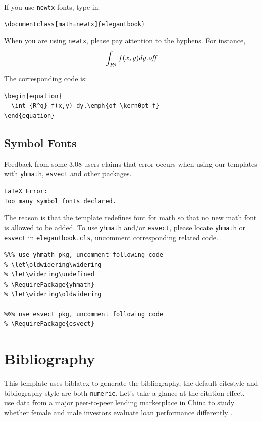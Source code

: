 \documentclass[11pt]{elegantbook}
\begin{document}
If you use \lstinline{newtx} fonts, type in:
\begin{lstlisting}
\documentclass[math=newtx]{elegantbook}
\end{lstlisting}

When you are using \lstinline{newtx}, please pay attention to the hyphens. For instance,
\begin{equation}
\int_{R^q} f(x,y) dy.\emph{of\kern0pt f}
\end{equation}

The corresponding code is: 
\begin{lstlisting}
\begin{equation}
  \int_{R^q} f(x,y) dy.\emph{of \kern0pt f}
\end{equation}
\end{lstlisting}

\subsection{Symbol Fonts}
Feedback from some 3.08 users claims that error occurs when using our templates with  \lstinline{yhmath}, \lstinline{esvect} and other packages.
\begin{lstlisting}
LaTeX Error:
Too many symbol fonts declared.
\end{lstlisting}

The reason is that the template redefines font for math so that no new math font is allowed to be added. To use \lstinline{yhmath} and/or \lstinline{esvect}, please locate \lstinline{yhmath} or \lstinline{esvect} in \lstinline{elegantbook.cls}, uncomment corresponding related code.

\begin{lstlisting}
%%% use yhmath pkg, uncomment following code
% \let\oldwidering\widering
% \let\widering\undefined
% \RequirePackage{yhmath}
% \let\widering\oldwidering

%%% use esvect pkg, uncomment following code
% \RequirePackage{esvect}
\end{lstlisting}

\section{Bibliography}

This template uses biblatex to generate the bibliography, the default citestyle and bibliography style are both \lstinline{numeric}. Let's take a glance at the citation effect. ~\cite{en1} use data from a major peer-to-peer lending \cite{en3} marketplace in China to study whether female and male investors evaluate loan performance differently \parencite{en2}. 
\end{document}
